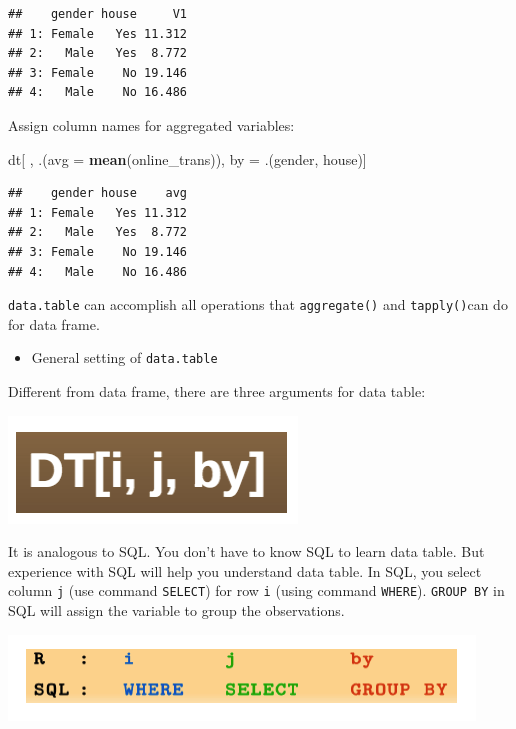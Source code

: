 \documentclass[12pt,]{krantz}
\makeatletter
\newenvironment{Shaded}{\begin{snugshade}}{\end{snugshade}}
\newcommand{\DataTypeTok}[1]{\textcolor[rgb]{0.27,0.27,0.27}{#1}}
\newcommand{\KeywordTok}[1]{\textcolor[rgb]{0.27,0.27,0.27}{\textbf{#1}}}
\newcommand{\NormalTok}[1]{#1}
\newcommand{\StringTok}[1]{\textcolor[rgb]{0.5,0.5,0.5}{#1}}
\providecommand{\tightlist}{%
  \setlength{\itemsep}{0pt}\setlength{\parskip}{0pt}}
\newenvironment{kframe}{%
\medskip{}
\setlength{\fboxsep}{.8em}
 \def\at@end@of@kframe{}%
 \ifinner\ifhmode%
  \def\at@end@of@kframe{\end{minipage}}%
  \begin{minipage}{\columnwidth}%
 \fi\fi%
 \def\FrameCommand##1{\hskip\@totalleftmargin \hskip-\fboxsep
 \colorbox{shadecolor}{##1}\hskip-\fboxsep
     \hskip-\linewidth \hskip-\@totalleftmargin \hskip\columnwidth}%
 \MakeFramed {\advance\hsize-\width
   \@totalleftmargin\z@ \linewidth\hsize
   \@setminipage}}%
 {\par\unskip\endMakeFramed%
 \at@end@of@kframe}
\renewenvironment{Shaded}{\begin{kframe}}{\end{kframe}}
\makeatother
\begin{document}
\begin{verbatim}
##    gender house     V1
## 1: Female   Yes 11.312
## 2:   Male   Yes  8.772
## 3: Female    No 19.146
## 4:   Male    No 16.486
\end{verbatim}

Assign column names for aggregated variables:

\begin{Shaded}
\begin{Highlighting}[]
\NormalTok{dt[ , .(}\DataTypeTok{avg =} \KeywordTok{mean}\NormalTok{(online_trans)), by =}\StringTok{ }\NormalTok{.(gender, house)]}
\end{Highlighting}
\end{Shaded}

\begin{verbatim}
##    gender house    avg
## 1: Female   Yes 11.312
## 2:   Male   Yes  8.772
## 3: Female    No 19.146
## 4:   Male    No 16.486
\end{verbatim}

\texttt{data.table} can accomplish all operations that \texttt{aggregate()} and \texttt{tapply()}can do for data frame.

\begin{itemize}
\tightlist
\item
  General setting of \texttt{data.table}
\end{itemize}

Different from data frame, there are three arguments for data table:

\includegraphics{images/datable1.png}

It is analogous to SQL. You don't have to know SQL to learn data table. But experience with SQL will help you understand data table. In SQL, you select column \texttt{j} (use command \texttt{SELECT}) for row \texttt{i} (using command \texttt{WHERE}). \texttt{GROUP\ BY} in SQL will assign the variable to group the observations.

\includegraphics{images/rSQL.png}
\end{document}
